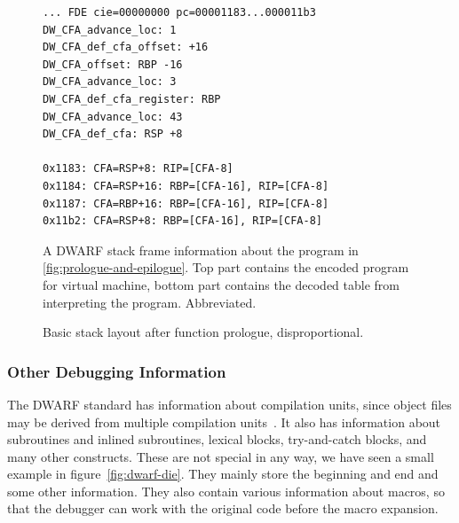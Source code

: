 \begin{figure}
    \begin{lstlisting}
... FDE cie=00000000 pc=00001183...000011b3
DW_CFA_advance_loc: 1
DW_CFA_def_cfa_offset: +16
DW_CFA_offset: RBP -16
DW_CFA_advance_loc: 3
DW_CFA_def_cfa_register: RBP
DW_CFA_advance_loc: 43
DW_CFA_def_cfa: RSP +8

0x1183: CFA=RSP+8: RIP=[CFA-8]
0x1184: CFA=RSP+16: RBP=[CFA-16], RIP=[CFA-8]
0x1187: CFA=RBP+16: RBP=[CFA-16], RIP=[CFA-8]
0x11b2: CFA=RSP+8: RBP=[CFA-16], RIP=[CFA-8]
    \end{lstlisting}
    \caption{A DWARF stack frame information about the program in
             \ref{fig:prologue-and-epilogue}. Top part contains the encoded
             program for virtual machine, bottom part contains the decoded
             table from interpreting the program. Abbreviated.}
    \label{fig:dwarf-stack-frames}
\end{figure}

\begin{figure}
    \centering
    \caption{Basic stack layout after function prologue, disproportional.}
    \label{fig:stack-layout}
\end{figure}

\subsubsection{Other Debugging Information}
The DWARF standard has information about compilation units, since object files
may be derived from multiple compilation units~\cite{dwarf}. It also has
information about subroutines and inlined subroutines, lexical blocks,
try-and-catch blocks, and many other constructs. These are not special in any
way, we have seen a small example in figure~\ref{fig:dwarf-die}. They mainly
store the beginning and end and some other information. They also contain
various information about macros, so that the debugger can work with the
original code before the macro expansion.

